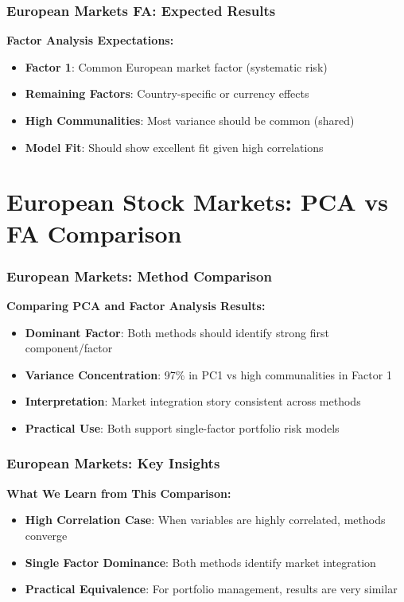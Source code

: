 \documentclass[aspectratio=169]{beamer}
\begin{document}
\begin{frame}
    \frametitle{European Markets FA: Expected Results}
    \textbf{Factor Analysis Expectations:}
    \begin{itemize}
        \item \textbf{Factor 1}: Common European market factor (systematic risk) \pause
        \item \textbf{Remaining Factors}: Country-specific or currency effects \pause
        \item \textbf{High Communalities}: Most variance should be common (shared) \pause
        \item \textbf{Model Fit}: Should show excellent fit given high correlations \pause
    \end{itemize}
\end{frame}

\section{European Stock Markets: PCA vs FA Comparison}

\begin{frame}
    \frametitle{European Markets: Method Comparison}
    \textbf{Comparing PCA and Factor Analysis Results:}
    \begin{itemize}
        \item \textbf{Dominant Factor}: Both methods should identify strong first component/factor \pause
        \item \textbf{Variance Concentration}: 97\% in PC1 vs high communalities in Factor 1 \pause
        \item \textbf{Interpretation}: Market integration story consistent across methods \pause
        \item \textbf{Practical Use}: Both support single-factor portfolio risk models \pause
    \end{itemize}
\end{frame}

\begin{frame}
    \frametitle{European Markets: Key Insights}
    \textbf{What We Learn from This Comparison:}
    \begin{itemize}
        \item \textbf{High Correlation Case}: When variables are highly correlated, methods converge \pause
        \item \textbf{Single Factor Dominance}: Both methods identify market integration \pause
        \item \textbf{Practical Equivalence}: For portfolio management, results are very similar \pause
    \end{itemize}
\end{frame}
\end{document}
